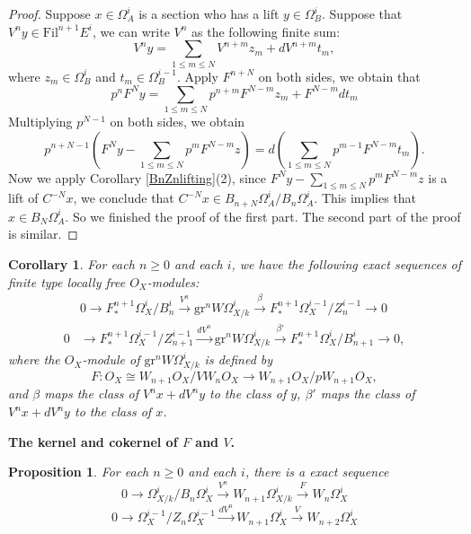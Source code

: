 \documentclass[a4paper,12pt,twoside]{report}
\newtheorem{proposition}[theorem]{Proposition}
\newtheorem{corollary}[theorem]{Corollary}
\newcommand{\Fil}{\mathrm{Fil}}
\newcommand{\gr}{\mathrm{gr}}
\begin{document}
\begin{appendices}
\begin{proof}
    Suppose $x\in \Omega_A^i$ is a section who has a lift $y\in \Omega_B^i$. 
    Suppose that $V^ny\in \Fil^{n+1}E^i$, 
    we can write $V^n$ as the following finite sum: 
    \[V^ny=\sum_{1\leqslant m\leqslant N}V^{n+m}z_m+dV^{n+m}t_m,\]
    where $z_m\in \Omega^i_B$ and $t_m\in \Omega^{i-1}_B$. Apply $F^{n+N}$ on both sides, 
    we obtain that\[p^nF^Ny=\sum_{1\leqslant m\leqslant N} p^{n+m}F^{N-m}z_m+ F^{N-m}dt_m\]
    Multiplying $p^{N-1}$ on both sides, we obtain
    \[p^{n+N-1}(F^Ny-\sum_{1\leqslant m\leqslant N}p^mF^{N-m}z)=d(\sum_{1\leqslant m\leqslant N}p^{m-1}F^{N-m}t_m).\]
    Now we apply Corollary \ref{BnZnlifting}(2), since $F^Ny-\sum_{1\leqslant m\leqslant N}p^mF^{N-m}z$ is a lift of $C^{-N}x$, 
    we conclude that $C^{-N}x\in B_{n+N}\Omega^i_A/B_n\Omega^i_A$. This implies that $x\in B_N\Omega^i_A$. 
    So we finished the proof of the first part. The second part of the proof is similar. 
    \end{proof}

    \begin{corollary}\label{Gradedpieces}
        For each $n\geq 0$ and each $i$, we have the following exact sequences of finite type locally free $O_X$-modules: 
        \[\begin{aligned}
            &0\rightarrow F^{n+1}_*\Omega^i_X/B_n^i \xrightarrow{V^n} \gr^nW\Omega^i_{X/k} \xrightarrow{\beta} F^{n+1}_*\Omega_X^{i-1}/Z_n^{i-1}\rightarrow 0\\
            0& \rightarrow F^{n+1}_*\Omega_X^{i-1}/Z_{n+1}^{i-1} \xrightarrow{dV^n} \gr^nW\Omega^i_{X/k} \xrightarrow{\beta'} F^{n+1}_*\Omega_X^{i}/B_{n+1}^i \rightarrow 0,
        \end{aligned}\]
        where the $O_X$-module of $\gr^nW\Omega^i_{X/k}$ is defined by \[F:O_X\cong W_{n+1}O_X/VW_{n}O_X\rightarrow W_{n+1}O_X/pW_{n+1}O_X,\]
        and $\beta$ maps the class of $V^nx+dV^ny$ to the class of $y$, $\beta'$ maps the class of $V^nx+dV^ny$ to the class of $x$. 
    \end{corollary}

    \medskip

    {\bf The kernel and cokernel of $F$ and $V$.}

    \begin{proposition}
        For each $n\geq 0$ and each $i$, there is a exact sequence 
        \[0\rightarrow \Omega^i_{X/k}/B_n\Omega^i_X \xrightarrow{V^n} W_{n+1}\Omega^i_{X/k} \xrightarrow{F} W_n\Omega^i_X\]
        \[0\rightarrow \Omega_X^{i-1}/Z_n\Omega_X^{i-1} \xrightarrow{dV^n} W_{n+1}\Omega_X^i \xrightarrow{V} W_{n+2}\Omega_X^i \]
    \end{proposition}


\end{appendices}
\end{document}
